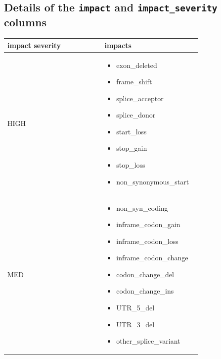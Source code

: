 \documentclass[letterpaper,10pt,english]{sphinxmanual}
\begin{document}
\subsection{Details of the \texttt{impact} and \texttt{impact\_severity} columns}
\label{content/database_schema:details-of-the-impact-and-impact-severity-columns}
\begin{tabular}{|p{0.475\linewidth}|p{0.475\linewidth}|}
\hline
\textbf{
impact severity
} & \textbf{
impacts
}\\\hline

HIGH
 & \begin{itemize}
\item {} 
exon\_deleted

\item {} 
frame\_shift

\item {} 
splice\_acceptor

\item {} 
splice\_donor

\item {} 
start\_loss

\item {} 
stop\_gain

\item {} 
stop\_loss

\item {} 
non\_synonymous\_start

\end{itemize}
\\\hline

MED
 & \begin{itemize}
\item {} 
non\_syn\_coding

\item {} 
inframe\_codon\_gain

\item {} 
inframe\_codon\_loss

\item {} 
inframe\_codon\_change

\item {} 
codon\_change\_del

\item {} 
codon\_change\_ins

\item {} 
UTR\_5\_del

\item {} 
UTR\_3\_del

\item {} 
other\_splice\_variant


\end{itemize}
\end{tabular}
\end{document}
